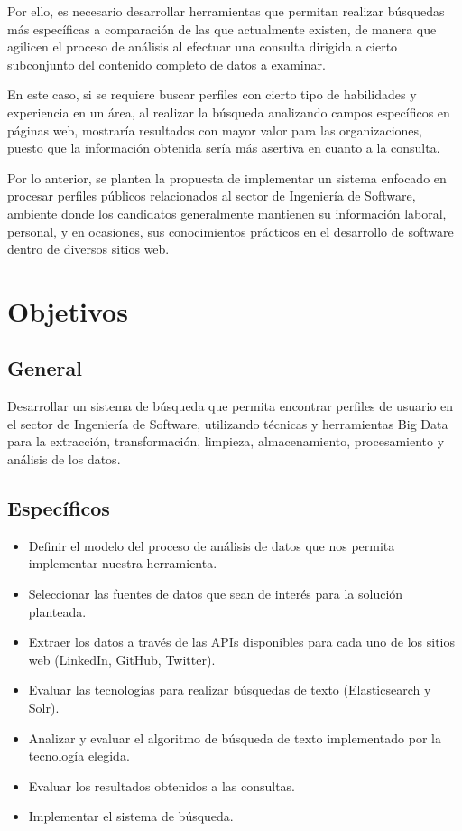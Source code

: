 Por ello, es necesario desarrollar herramientas que permitan realizar búsquedas más específicas a comparación de las que actualmente existen, de manera que agilicen el proceso de análisis al efectuar una consulta dirigida a cierto subconjunto del contenido completo de datos  a examinar.

En este caso, si se requiere buscar perfiles con cierto tipo de habilidades y experiencia en un área, al realizar la búsqueda analizando campos específicos en páginas web, mostraría resultados con mayor valor para las organizaciones, puesto que la información obtenida sería más asertiva en cuanto a la consulta.

Por lo anterior, se plantea la propuesta de implementar un sistema enfocado en procesar perfiles p\'ublicos relacionados al sector de Ingenier\'ia de Software, ambiente donde los candidatos generalmente mantienen su informaci\'on laboral, personal, y en ocasiones, sus conocimientos pr\'acticos en el desarrollo de software dentro de diversos sitios web.


\section{Objetivos}
\label{sec:sec03}

\subsection{General}
\label{subsec:subsec03}

Desarrollar un sistema de b\'usqueda que permita encontrar perfiles de usuario en el sector de Ingenier\'ia de Software, utilizando t\'ecnicas y herramientas Big Data para la extracci\'on, transformaci\'on, limpieza, almacenamiento, procesamiento y an\'alisis de los datos.

\subsection{Espec\'ificos}
\label{subsec:subsec03}
  \begin{itemize}
	\item Definir el modelo del proceso de an\'alisis de datos que nos permita implementar nuestra herramienta.

	\item Seleccionar las fuentes de datos que sean de inter\'es para la soluci\'on planteada.

	\item Extraer los datos a trav\'es de las APIs disponibles para cada uno de los sitios web (LinkedIn, GitHub, Twitter).

	\item Evaluar las tecnolog\'ias para realizar b\'usquedas de texto (Elasticsearch y Solr).

	\item Analizar y evaluar el algoritmo de búsqueda de texto implementado por la tecnología elegida.
    
	\item Evaluar los resultados obtenidos a las consultas.
    \item Implementar el sistema de búsqueda. 
\end{itemize}

